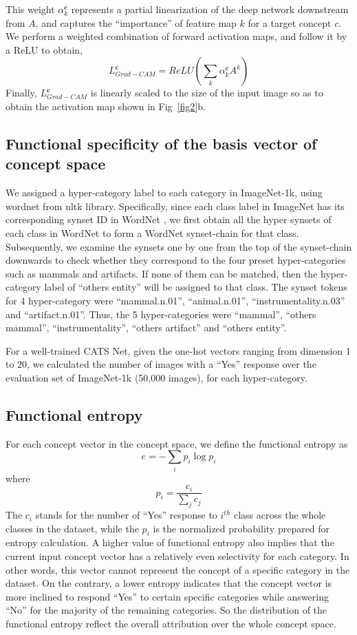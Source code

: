 \documentclass[pdflatex,sn-mathphys-num,lineno]{sn-jnl}%
\begin{document}
\begin{CJK}{UTF8}{gbsn}
This weight $\alpha_k^\mathbf{c}$ represents a partial linearization of the deep network downstream from $A$, and captures the “importance” of feature map $k$ for a target concept $c$. We perform a weighted combination of forward activation maps, and follow it by a ReLU to obtain,
$$L_{Grad-CAM}^{\mathbf{c}} = ReLU(\sum_k \alpha_k^\mathbf{c} A^k)$$ Finally, $L_{Grad-CAM}^{\mathbf{c}}$ is linearly scaled to the size of the input image so as to obtain the activation map shown in Fig~\ref{fig2}b.

\subsection{Functional specificity of the basis vector of concept space}
We assigned a hyper-category label to each category in ImageNet-1k, using wordnet from nltk library. Specifically, since each class label in ImageNet has its corresponding synset ID in WordNet \cite{fellbaum_wordnet_1998}, we first obtain all the hyper synsets of each class in WordNet to form a WordNet synset-chain for that class. Subsequently, we examine the synsets one by one from the top of the synset-chain downwards to check whether they correspond to the four preset hyper-categories such as mammals and artifacts. If none of them can be matched, then the hyper-category label of “others entity” will be assigned to that class. The synset tokens for 4 hyper-category were “mammal.n.01”, “animal.n.01”, “instrumentality.n.03” and “artifact.n.01”. Thus, the 5 hyper-categories were “mammal”, “others mammal”, “instrumentality”, “others artifact” and “others entity”.

For a well-trained CATS Net, given the one-hot vectors ranging from dimension 1 to 20, we calculated the number of images with a “Yes” response over the evaluation set of ImageNet-1k (50,000 images), for each hyper-category.

\subsection{Functional entropy}
For each concept vector in the concept space, we define the functional entropy as 
$$\displaystyle e=-\sum_{i} p_i \log p_i$$
where 
$$\displaystyle p_i = \frac{c_i}{\sum_{j}c_j}$$
The $c_i$ stands for the number of “Yes” response to $i^{th}$ class across the whole classes in the dataset, while the $p_i$ is the normalized probability prepared for entropy calculation. A higher value of functional entropy also implies that the current input concept vector has a relatively even selectivity for each category. In other words, this vector cannot represent the concept of a specific category in the dataset. On the contrary, a lower entropy indicates that the concept vector is more inclined to respond “Yes” to certain specific categories while answering “No” for the majority of the remaining categories. So the distribution of the functional entropy reflect the overall attribution over the whole concept space.


\end{CJK}
\end{document}
